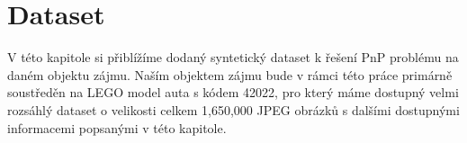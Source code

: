 \chapter{Dataset}
\label{sec:Chapter3}
V této kapitole si přiblížíme dodaný syntetický dataset k řešení PnP problému na daném objektu zájmu. Naším objektem zájmu bude v rámci této práce primárně soustředěn na LEGO model auta s kódem 42022, pro který máme dostupný velmi rozsáhlý dataset o velikosti celkem 1,650,000 JPEG obrázků s dalšími dostupnými informacemi popsanými v této kapitole. 
\endinput